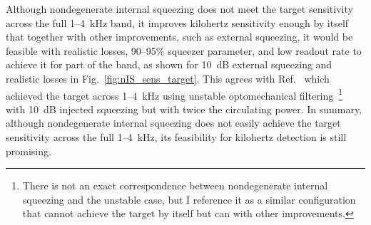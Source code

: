 Although nondegenerate internal squeezing does not meet the target sensitivity across the full 1--4~kHz band, it improves kilohertz sensitivity enough by itself that together with other improvements, such as external squeezing, it would be feasible with realistic losses, 90--95$\%$ squeezer parameter, and low readout rate to achieve it for part of the band, as shown for 10~dB external squeezing and realistic losses in Fig.~\ref{fig:nIS_sens_target}. This agrees with Ref.~\cite{miaoDesignGravitationalWaveDetectors2018} which achieved the target across 1--4~kHz using unstable optomechanical filtering~\footnote{There is not an exact correspondence between nondegenerate internal squeezing and the unstable case, but I reference it as a similar configuration that cannot achieve the target by itself but can with other improvements.} with 10~dB injected squeezing but with twice the circulating power. %
In summary, although nondegenerate internal squeezing does not easily achieve the target sensitivity across the full 1--4~kHz, its feasibility for kilohertz detection is still promising.


\label{sec:signalRO_broadband}


